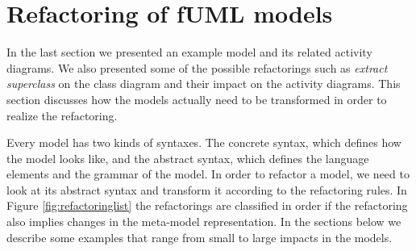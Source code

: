 \documentclass{llncs}
\begin{document}
\section{Refactoring of fUML models}
\label{sec:fuml-refactoring}

In the last section we presented an example model and its related activity diagrams. We also presented some of the possible 
refactorings such as \textit{extract superclass} on the class diagram and their impact on the activity diagrams. This 
section discusses how the models actually need to be transformed in order to realize the refactoring.

Every model has two kinds of syntaxes. The concrete syntax, which defines how the model looks like, and the abstract
syntax, which defines the language elements and the grammar of the model. In order to refactor a model, we need to look 
at its abstract syntax and transform it according to the refactoring rules. In Figure \ref{fig:refactoringlist} the 
refactorings are classified in order if the refactoring also implies changes in the meta-model representation. In the 
sections below we describe some examples that range from small to large impacts in the models.
\end{document}
